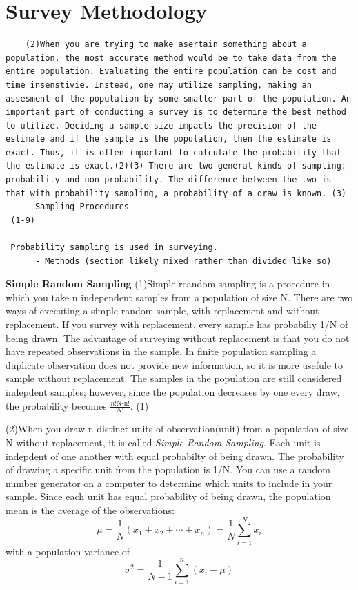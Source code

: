 \documentclass[12pt,twoside]{reedthesis}
\begin{document}
\hypertarget{survey-methodology}{%
\section{Survey Methodology}\label{survey-methodology}}
\begin{verbatim}
    (2)When you are trying to make asertain something about a population, the most accurate method would be to take data from the entire population. Evaluating the entire population can be cost and time insenstivie. Instead, one may utilize sampling, making an assesment of the population by some smaller part of the population. An important part of conducting a survey is to determine the best method to utilize. Deciding a sample size impacts the precision of the estimate and if the sample is the population, then the estimate is exact. Thus, it is often important to calculate the probability that the estimate is exact.(2)(3) There are two general kinds of sampling: probability and non-probability. The difference between the two is that with probability sampling, a probability of a draw is known. (3)
    - Sampling Procedures
 (1-9)
 
 Probability sampling is used in surveying.
      - Methods (section likely mixed rather than divided like so)
\end{verbatim}
\textbf{Simple Random Sampling}
(1)Simple reandom sampling is a procedure in which you take n independent samples from a population of size N. There are two ways of executing a simple random sample, with replacement and without replacement. If you survey with replacement, every sample has probabiliy 1/N of being drawn. The advantage of surveying without replacement is that you do not have repeated observations in the sample. In finite population sampling a duplicate observation does not provide new information, so it is more usefule to sample without replacement. The samples in the population are still considered indepdent samples; however, since the population decreases by one every draw, the probability becomes \(\frac{n!\text{N-n}!}{N!}\). (1)

(2)When you draw n distinct units of observation(unit) from a population of size N without replacement, it is called \emph{Simple Random Sampling}. Each unit is indepdent of one another with equal probabilty of being drawn. The probability of drawing a specific unit from the population is 1/N. You can use a random number generator on a computer to determine which units to include in your sample. Since each unit has equal probability of being drawn, the population mean is the average of the observations:
\[
\mu = \frac{1}{N} \left(x_1 + x_2 + \cdots + x_n \right) = \frac{1}{N} \sum^{N}_{i=1} x_i
\]
with a population variance of
\[
\sigma^2 = \frac{1}{N-1} \sum_{i=1}^{n} \left(x_i - \mu \right)
\]
\end{document}
